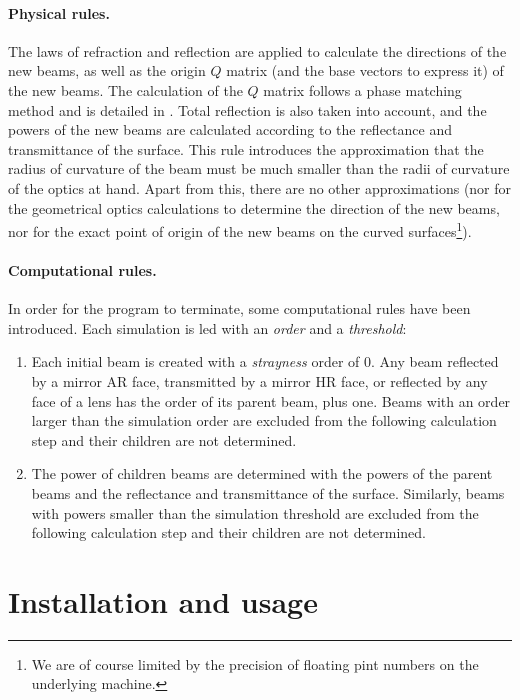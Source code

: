 \documentclass{article}
\begin{document}
\paragraph{Physical rules.}The laws of refraction and  reflection are applied to calculate the directions of the new beams, as well as the origin $Q$ matrix (and the base vectors to express it) of the new beams.  The calculation of the $Q$ matrix follows a phase matching method and is detailed in \cite{1,2}. Total reflection is also taken into account, and the powers of the new beams are calculated according to the reflectance and transmittance of the surface. This rule introduces the approximation that the radius of curvature of the beam must be much smaller than the radii of curvature of the optics at hand. Apart from this, there are no other approximations (nor for the geometrical optics calculations to determine the direction of the new beams, nor for the exact point of origin of the new beams on the curved surfaces\footnote{We are of course limited by the precision of floating pint numbers on the underlying machine.}). 

\paragraph{Computational rules.}In order for the program to terminate, some computational rules have been introduced. Each simulation is led with an \textit{order} and a \textit{threshold}:

\begin{enumerate}
\item Each initial beam is created with a \textit{strayness} order of 0. Any beam reflected by a mirror AR face, transmitted by a mirror HR face, or reflected by any face of a lens has the order of its parent beam, plus one. Beams with an order larger than the simulation order are excluded from the following calculation step and their children are not determined.

\item The power of children beams are determined with the powers of the parent beams and the reflectance and transmittance of the surface. Similarly, beams with powers smaller than the simulation threshold are excluded from the following calculation step and their children are not determined.

\end{enumerate}

\section{Installation and usage}
\end{document}
